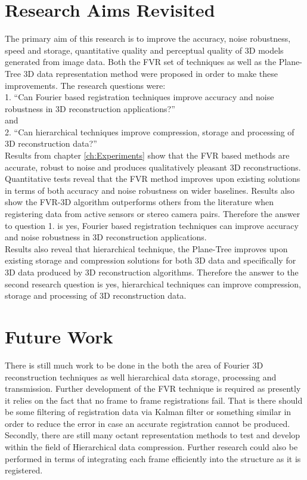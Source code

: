 \section{Research Aims Revisited}

The primary aim of this research is to improve the accuracy, noise robustness, speed and storage, quantitative quality and perceptual quality of 3D models generated from image data. Both the FVR set of techniques as well as the Plane-Tree 3D data representation method were proposed in order to make these improvements. The research questions were: \\

1. ``Can Fourier based registration techniques improve accuracy and noise robustness in 3D reconstruction applications?'' \\

and \\

2. ``Can hierarchical techniques improve compression, storage and processing of 3D reconstruction data?'' \\


Results from chapter \ref{ch:Experiments} show that the FVR based methods are accurate, robust to noise and produces qualitatively pleasant 3D reconstructions. Quantitative tests reveal that the FVR method improves upon existing solutions in terms of both accuracy and noise robustness on wider baselines. Results also show the FVR-3D algorithm outperforms others from the literature when registering data from active sensors or stereo camera pairs. Therefore the answer to question 1. is yes, Fourier based registration techniques can improve accuracy and noise robustness in 3D reconstruction applications. \\


Results also reveal that hierarchical technique, the Plane-Tree improves upon existing storage and compression solutions for both 3D data and specifically for 3D data produced by 3D reconstruction algorithms. Therefore the answer to the second research question is yes, hierarchical techniques can improve compression, storage and processing of 3D reconstruction data. \\

\section{Future Work}

There is still much work to be done in the both the area of Fourier 3D reconstruction techniques as well hierarchical data storage, processing and transmission. Further development of the FVR technique is required as presently it relies on the fact that no frame to frame registrations fail. That is there should be some filtering of registration data via Kalman filter or something similar in order to reduce the error in case an accurate registration cannot be produced. Secondly, there are still many octant representation methods to test and develop within the field of Hierarchical data compression. Further research could also be performed in terms of integrating each frame efficiently into the structure as it is registered. \\
